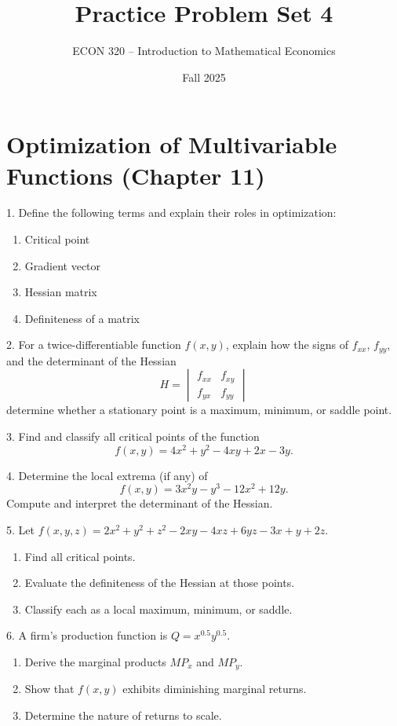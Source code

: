 \documentclass[12pt]{article}
\title{Practice Problem Set 4}
\author{ECON 320 -- Introduction to Mathematical Economics}
\date{Fall 2025}
\begin{document}
\maketitle


\section*{Optimization of Multivariable Functions (Chapter 11)}



1. Define the following terms and explain their roles in optimization:
   \begin{enumerate}
     \item Critical point
     \item Gradient vector
     \item Hessian matrix
     \item Definiteness of a matrix
   \end{enumerate}

2. For a twice-differentiable function \(f(x, y)\), explain how the signs of \(f_{xx}\), \(f_{yy}\), and the determinant of the Hessian
   \[
   H = 
   \begin{vmatrix}
   f_{xx} & f_{xy} \\
   f_{yx} & f_{yy}
   \end{vmatrix}
   \]
   determine whether a stationary point is a maximum, minimum, or saddle point.



3. Find and classify all critical points of the function
   \[
   f(x, y) = 4x^2 + y^2 - 4xy + 2x - 3y.
   \]

4. Determine the local extrema (if any) of
   \[
   f(x, y) = 3x^2y - y^3 - 12x^2 + 12y.
   \]
   Compute and interpret the determinant of the Hessian.

5. Let \(f(x, y, z) = 2x^2 + y^2 + z^2 - 2xy - 4xz + 6yz - 3x + y + 2z.\)
   \begin{enumerate}
     \item Find all critical points.
     \item Evaluate the definiteness of the Hessian at those points.
     \item Classify each as a local maximum, minimum, or saddle.
   \end{enumerate}

6. A firm’s production function is \(Q = x^{0.5}y^{0.5}\).
   \begin{enumerate}
     \item Derive the marginal products \(MP_x\) and \(MP_y\).
     \item Show that \(f(x, y)\) exhibits diminishing marginal returns.
     \item Determine the nature of returns to scale.
   \end{enumerate}
\end{document}
